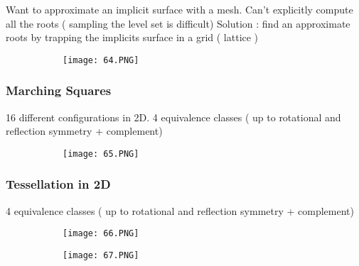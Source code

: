 \documentclass{article}
\begin{document}
Want to approximate an implicit surface with a mesh.
Can't explicitly compute all the roots ( sampling the level set is difficult)
Solution : find an approximate roots by trapping the implicits surface in a grid ( lattice )

\begin{figure}[ht!]
  \centering
  \begin{subfigure}[b]{0.15\linewidth}
    \texttt{[image: 64.PNG]}
  \end{subfigure}
\end{figure}

\subsubsection{Marching Squares}

16 different configurations in 2D.
4 equivalence classes ( up to rotational and reflection symmetry + complement)

\begin{figure}[ht!]
  \centering
  \begin{subfigure}[b]{0.3\linewidth}
    \texttt{[image: 65.PNG]}
  \end{subfigure}
\end{figure}


\subsubsection{Tessellation in 2D}

4 equivalence classes ( up to rotational and reflection symmetry + complement)


\begin{figure}[ht!]
  \centering
  \begin{subfigure}[b]{0.29\linewidth}
    \texttt{[image: 66.PNG]}
  \end{subfigure}
  \begin{subfigure}[b]{0.7\textwidth}
         \centering
         \texttt{[image: 67.PNG]}
     \end{subfigure}
\end{figure}
\end{document}
